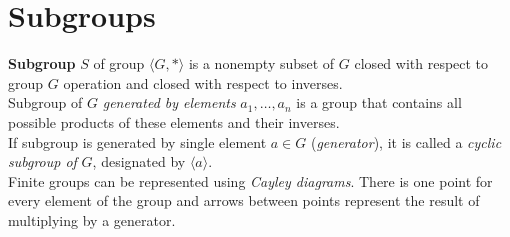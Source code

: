 \documentclass[a4paper,12pt]{article}
\theoremstyle{definition}
\theoremstyle{axiom}
\theoremstyle{theorem}
\begin{document}
\section{Subgroups}
\textbf{Subgroup} $S$ of group $\langle G, * \rangle$ is a nonempty subset of $G$ closed with respect to group $G$ operation and closed with respect to inverses.
\\
Subgroup of $G$ \textit{generated by elements} $a_1, \dots ,a_n$ is a group that contains all possible products of these elements and their inverses.
\\
If subgroup is generated by single element $a \in G$ (\textit{generator}), it is called a \textit{cyclic subgroup of} $G$, designated by $\langle a \rangle$.
\\
Finite groups can be represented using \textit{Cayley diagrams}. There is one point for every element of the group and arrows between points represent the result of multiplying by a generator.
\end{document}
